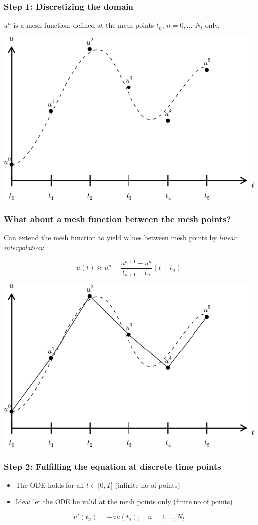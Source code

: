 \documentclass{beamer}
\begin{document}
\begin{frame}
\frametitle{Step 1: Discretizing the domain}

$u^n$ is a mesh function, defined at the mesh points $t_n$, $n=0,\ldots,N_t$
only.




\centerline{\includegraphics[width=0.7\linewidth]{fig-alg/fdm_u_ue.png}}
\end{frame}

\begin{frame}
\frametitle{What about a mesh function between the mesh points?}

Can extend the mesh function to yield values between mesh points
by \emph{linear interpolation}:

\begin{equation}
u(t) \approx u^n + \frac{u^{n+1}-u^n}{t_{n+1}-t_n}(t - t_n)
\end{equation}



\centerline{\includegraphics[width=0.7\linewidth]{fig-alg/fdm_u_uei.png}}
\end{frame}

\begin{frame}
\frametitle{Step 2: Fulfilling the equation at discrete time points}

\begin{itemize}
 \item The ODE holds for all $t\in (0,T]$ (infinite no of points)

 \item Idea: let the ODE be valid at the mesh points only (finite no of points)
\end{itemize}

\noindent
\begin{equation}
u'(t_n) = -au(t_n),\quad n=1,\ldots,N_t
\label{decay:step2}
\end{equation}

\end{frame}
\end{document}
